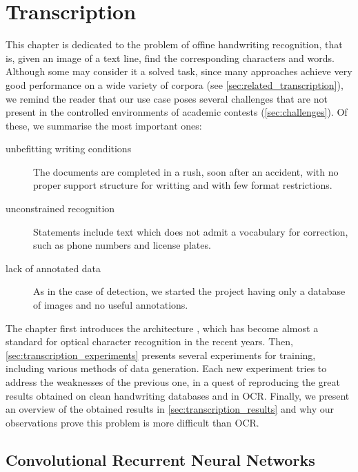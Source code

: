 
\chapter{Transcription}\label{ch:transcription}

This chapter is dedicated to the problem of offine handwriting recognition, that is, given an image of a text line, find the corresponding characters and words. Although some may consider it a solved task, since many approaches achieve very good performance on a wide variety of corpora (see \autoref{sec:related_transcription}), we remind the reader that our use case poses several challenges that are not present in the controlled environments of academic contests (\autoref{sec:challenges}). Of these, we summarise the most important ones:
\begin{description}
	\item[unbefitting writing conditions] The documents are completed in a rush, soon after an accident, with no proper support structure for writting and with few format restrictions.

	\item[unconstrained recognition] Statements include text which does not admit a vocabulary for correction, such as phone numbers and license plates.

	\item[lack of annotated data] As in the case of detection, we started the project having only a database of images and no useful annotations.
\end{description}

The chapter first introduces the \CRNN{} architecture \citep{CRNN}, which has become almost a standard for optical character recognition in the recent years. Then, \autoref{sec:transcription_experiments} presents several experiments for training, including various methods of data generation. Each new experiment tries to address the weaknesses of the previous one, in a quest of reproducing the great results obtained on clean handwriting databases and in OCR. Finally, we present an overview of the obtained results in \autoref{sec:transcription_results} and why our observations prove this problem is more difficult than OCR.




\section{Convolutional Recurrent Neural Networks}\label{sec:crnn}

